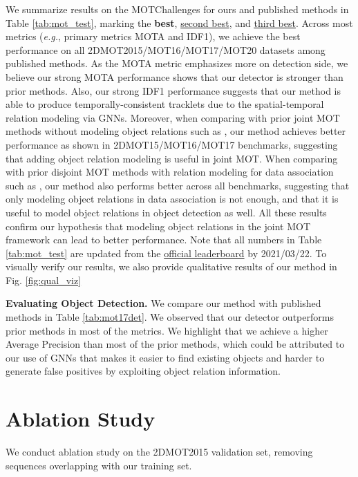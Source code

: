 \documentclass[letterpaper, 10 pt, conference]{ieeeconf}
\newcommand\ul[1]{\underline{#1}}
\newcommand\uul[1]{\underline{\underline{#1}}}
\begin{document}
We summarize results on the MOTChallenges for ours and published methods in Table \ref{tab:mot_test}, marking the \textbf{best}, \ul{second best}, and \uul{third best}. Across most metrics (\emph{e.g.}, primary metrics MOTA and IDF1), we achieve the best performance on all 2DMOT2015/MOT16/MOT17/MOT20 datasets among published methods. As the MOTA metric emphasizes more on detection side, we believe our strong MOTA performance shows that our detector is stronger than prior methods. Also, our strong IDF1 performance suggests that our method is able to produce temporally-consistent tracklets due to the spatial-temporal relation modeling via GNNs. Moreover, when comparing with prior joint MOT methods without modeling object relations such as \cite{B2016, pang2020tubetk}, our method achieves better performance as shown in 2DMOT15/MOT16/MOT17 benchmarks, suggesting that adding object relation modeling is useful in joint MOT. When comparing with prior disjoint MOT methods with relation modeling for data association such as \cite{Braso2020}, our method also performs better across all benchmarks, suggesting that only modeling object relations in data association is not enough, and that it is useful to model object relations in object detection as well. All these results confirm our hypothesis that modeling object relations in the joint MOT framework can lead to better performance. Note that all numbers in Table \ref{tab:mot_test} are updated from the \textcolor{blue}{\href{https://motchallenge.net/results/MOT20/?det=All}{official leaderboard}} by 2021/03/22. To visually verify our results, we also provide qualitative results of our method in Fig. \ref{fig:qual_viz}

\vspace{1mm}\noindent\textbf{Evaluating Object Detection.}
We compare our method with published methods in Table \ref{tab:mot17det}.
We observed that our detector outperforms prior methods in most of the metrics. We highlight that we achieve a higher Average Precision than most of the prior methods, which could be attributed to our use of GNNs that makes it easier to find existing objects and harder to generate false positives by exploiting object relation information.
 
\section{Ablation Study}
We conduct ablation study on the 2DMOT2015 validation set, removing sequences overlapping with our training set.
\end{document}
